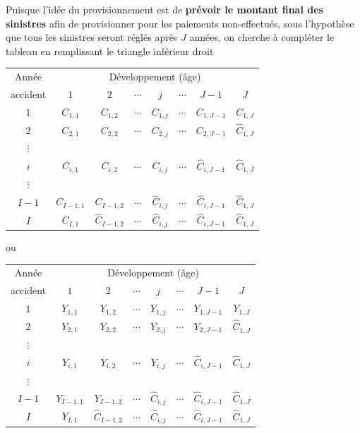 Puisque l'idée du provisionnement est de \textbf{prévoir le montant
  final des sinistres} afin de provisionner pour les paiements
non-effectués, sous l'hypothèse que tous les sinistres seront réglés
après $J$ années, on cherche à compléter le tableau en remplissant le
triangle inférieur droit
\begin{center}
  \begin{tabular}{*{8}{c}}
    \toprule
    Année & \multicolumn{7}{c}{Développement (âge)} \\
    accident & $1$ & $2$ & $\cdots$ & $j$ & $\cdots$ & $J - 1$ & $J$ \\
    \midrule
    $1$ & $C_{1, 1}$ & $C_{1, 2}$ & $\cdots$ & $C_{1, j}$ & $\cdots$ & $C_{1, J-1}$ & $C_{1, J}$ \\
    $2$ & $C_{2, 1}$ & $C_{2, 2}$ & $\cdots$ & $C_{2, j}$ & $\cdots$ & $C_{2, J-1}$ & $\hat{C}_{1, J}$ \\
    $\vdots$ \\
    $i$ & $C_{i, 1}$ & $C_{i, 2}$ & $\cdots$ & $C_{i, j}$ & $\cdots$ & $\hat{C}_{i, J-1}$ & $\hat{C}_{1, J}$ \\
    $\vdots$ \\
    $I - 1$ & $C_{I-1, 1}$ & $C_{I-1, 2}$  & $\cdots$ & $\hat{C}_{i, j}$ & $\cdots$ & $\hat{C}_{i, J-1}$ & $\hat{C}_{1, J}$ \\
    $I$ & $C_{I, 1}$ & $\hat{C}_{I-1, 2}$  & $\cdots$ & $\hat{C}_{i, j}$ & $\cdots$ & $\hat{C}_{i, J-1}$ & $\hat{C}_{1, J}$ \\
    \bottomrule
  \end{tabular}
\end{center}
ou
\begin{center}
  \begin{tabular}{*{8}{c}}
    \toprule
    Année & \multicolumn{7}{c}{Développement (âge)} \\
    accident & $1$ & $2$ & $\cdots$ & $j$ & $\cdots$ & $J - 1$ & $J$ \\
    \midrule
    $1$ & $Y_{1, 1}$ & $Y_{1, 2}$ & $\cdots$ & $Y_{1, j}$ & $\cdots$ & $Y_{1, J-1}$ & $Y_{1, J}$ \\
    $2$ & $Y_{2, 1}$ & $Y_{2, 2}$ & $\cdots$ & $Y_{2, j}$ & $\cdots$ & $Y_{2, J-1}$ & $\hat{C}_{1, J}$ \\
    $\vdots$ \\
    $i$ & $Y_{i, 1}$ & $Y_{i, 2}$ & $\cdots$ & $Y_{i, j}$ & $\cdots$ & $\hat{C}_{i, J-1}$ & $\hat{C}_{1, J}$ \\
    $\vdots$ \\
    $I - 1$ & $Y_{I-1, 1}$ & $Y_{I-1, 2}$  & $\cdots$ & $\hat{C}_{i, j}$ & $\cdots$ & $\hat{C}_{i, J-1}$ & $\hat{C}_{1, J}$ \\
    $I$ & $Y_{I, 1}$ & $\hat{C}_{I-1, 2}$  & $\cdots$ & $\hat{C}_{i, j}$ & $\cdots$ & $\hat{C}_{i, J-1}$ & $\hat{C}_{1, J}$ \\
    \bottomrule
  \end{tabular}
\end{center}

